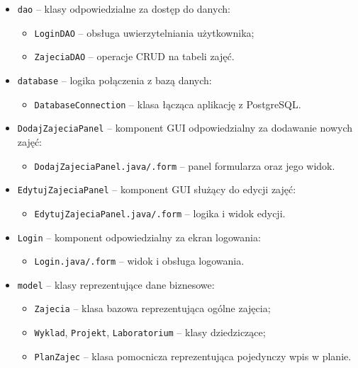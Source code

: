 \begin{itemize}
    \item \texttt{dao} – klasy odpowiedzialne za dostęp do danych:
    \begin{itemize}
        \item \texttt{LoginDAO} – obsługa uwierzytelniania użytkownika;
        \item \texttt{ZajeciaDAO} – operacje CRUD na tabeli zajęć.
    \end{itemize}

    \item \texttt{database} – logika połączenia z bazą danych:
    \begin{itemize}
        \item \texttt{DatabaseConnection} – klasa łącząca aplikację z PostgreSQL.
    \end{itemize}

    \item \texttt{DodajZajeciaPanel} – komponent GUI odpowiedzialny za dodawanie nowych zajęć:
    \begin{itemize}
        \item \texttt{DodajZajeciaPanel.java/.form} – panel formularza oraz jego widok.
    \end{itemize}

    \item \texttt{EdytujZajeciaPanel} – komponent GUI służący do edycji zajęć:
    \begin{itemize}
        \item \texttt{EdytujZajeciaPanel.java/.form} – logika i widok edycji.
    \end{itemize}

    \item \texttt{Login} – komponent odpowiedzialny za ekran logowania:
    \begin{itemize}
        \item \texttt{Login.java/.form} – widok i obsługa logowania.
    \end{itemize}

    \item \texttt{model} – klasy reprezentujące dane biznesowe:
    \begin{itemize}
        \item \texttt{Zajecia} – klasa bazowa reprezentująca ogólne zajęcia;
        \item \texttt{Wyklad}, \texttt{Projekt}, \texttt{Laboratorium} – klasy dziedziczące;
        \item \texttt{PlanZajec} – klasa pomocnicza reprezentująca pojedynczy wpis w planie.
    \end{itemize}


\end{itemize}
